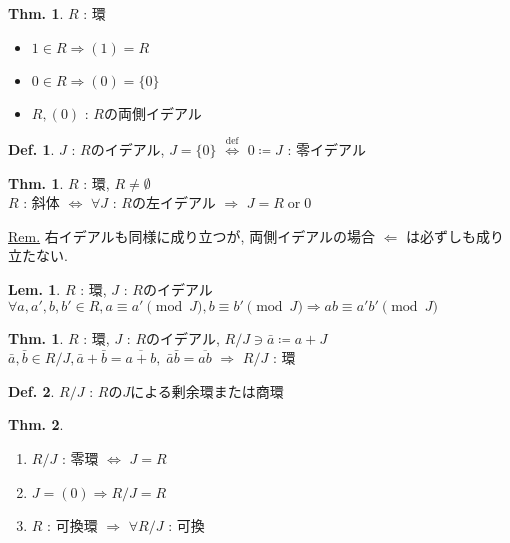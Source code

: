 \documentclass[uplatex,dvipdfmx,9pt]{beamer}
\newcommand{\defarrow}{\overset{\mathrm{def}}{\Leftrightarrow}}
\newcounter{textThmCount}
\newcounter{textLemCount}
\theoremstyle{definition} %
\newtheorem{defn}{Def.}[subsection] %
\newtheorem{thm}{Thm.}[subsection] %
\newtheorem{thmText}[textThmCount]{Thm.}
\newtheorem{lemText}[textLemCount]{Lem.} %
\theoremstyle{example}
\begin{document}
    \begin{frame}

       \begin{thm}
        $R$ : 環
        \begin{itemize}
          \item $1 \in R \Rightarrow (1) = R$
          \item $0 \in R \Rightarrow (0) = \{0\}$
          \item $R, (0)$ : $R$の両側イデアル
        \end{itemize}
      \end{thm}

      \begin{defn}
        $J$ : $R$のイデアル, $J = \{0\}$ $\defarrow$ $0 \coloneqq J$ : \alert{零イデアル}
      \end{defn}

      \begin{thmText}
        $R$ : 環, $R \neq \emptyset$ \\
        $R$ : 斜体 $\Leftrightarrow$ $\forall J$ : $R$の左イデアル $\Rightarrow$ $J = R \; \text{or} \; 0$
      \end{thmText}
      \underline{Rem.} 右イデアルも同様に成り立つが, 両側イデアルの場合 $\Leftarrow$ は必ずしも成り立たない.

    \end{frame}

    \begin{frame}

      \begin{lemText}
        $R$ : 環, $J$ : $R$のイデアル \\
        $\forall a, a', b, b' \in R, a \equiv a' \pmod{J}, b \equiv b' \pmod{J} \Rightarrow ab \equiv a'b' \pmod{J}$
      \end{lemText}

      \begin{thmText}
        $R$ : 環, $J$ : $R$のイデアル, $R/J \ni \bar{a} \coloneqq a + J$ \\
        $\bar{a}, \bar{b} \in R/J, \bar{a} + \bar{b} = \overline{a + b}, \; \bar{a}\bar{b} = \overline{ab}$ $\Rightarrow$ $R/J$ : 環
      \end{thmText}

      \begin{defn}
        $R/J$ : $R$の$J$による\alert{剰余環}または\alert{商環}
      \end{defn}

      \begin{thm}
        \begin{enumerate}
          \item $R/J$ : 零環 $\Leftrightarrow$ $J = R$
          \item $J = (0) \Rightarrow R/J = R$
          \item $R$ : 可換環 $\Rightarrow$ $\forall R/J$ : 可換
        \end{enumerate}
      \end{thm}

    \end{frame}
\end{document}
